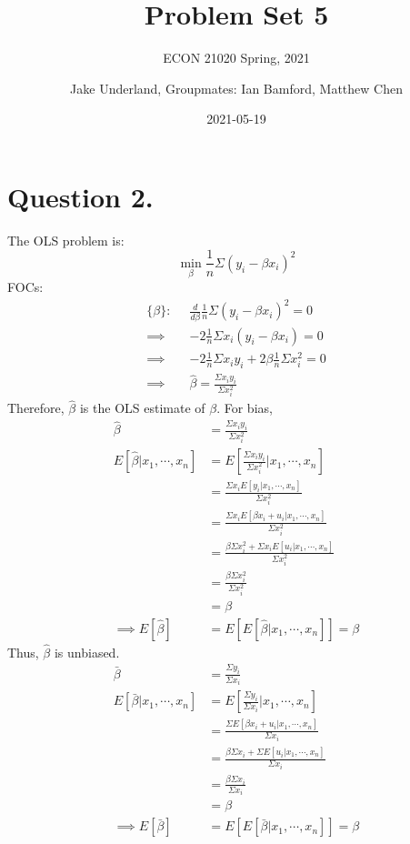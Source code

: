 \documentclass[
]{article}
\title{Problem Set 5}
\subtitle{ECON 21020 Spring, 2021}
\author{Jake Underland, Groupmates: Ian Bamford, Matthew Chen}
\date{2021-05-19}
\begin{document}
\maketitle

\hypertarget{question-2.}{%
\section{Question 2.}\label{question-2.}}

The OLS problem is: \[\min _ \beta \frac{1}{n}\Sigma(y_i-\beta x_i)^2\]
FOCs: \[\begin{aligned}
\{\beta\}: \; \; &\frac{d}{d\beta} \frac{1}{n}\Sigma(y_i-\beta x_i)^2 = 0\\
\implies& -2\frac{1}{n}\Sigma x_i(y_i-\beta x_i) = 0  \\
\implies& -2 \frac{1}{n}\Sigma x_iy_i + 2 \beta \frac{1}{n}\Sigma x_i^2 = 0 \\
\implies& \hat{\beta}= \frac{\Sigma x_iy_i}{\Sigma x_i^2}
\end{aligned}\] Therefore, \(\hat{\beta}\) is the OLS estimate of
\(\beta\). For bias, \[\begin{aligned} 
\hat{\beta} &=  \frac{\Sigma x_iy_i}{\Sigma x_i^2}\\
E[\hat{\beta}|x_1, \cdots, x_n] &= E[\frac{\Sigma x_iy_i}{\Sigma x_i^2}|x_1, \cdots, x_n]\\ 
&= \frac{\Sigma x_i E[y_i|x_1, \cdots, x_n]}{\Sigma x_i^2}\\
&= \frac{\Sigma x_i E[\beta x_i + u_i|x_1, \cdots, x_n]}{\Sigma x_i^2} \\
&= \frac{\beta \Sigma x_i ^2  + \Sigma x_iE[u_i|x_1, \cdots, x_n]}{\Sigma x_i^2} \\
&= \frac{\beta \Sigma x_i ^2}{\Sigma x_i^2}\\ 
&= \beta  \\
\implies E[\hat{\beta}] &= E[E[\hat{\beta} | x_1, \cdots, x_n]] = \beta
\end{aligned}\] Thus, \(\hat{\beta}\) is unbiased. \[\begin{aligned} 
\bar{\beta} &=  \frac{\Sigma y_i}{\Sigma x_i} \\
E[\bar{\beta}|x_1, \cdots, x_n] &= E[\frac{\Sigma y_i}{\Sigma x_i}|x_1, \cdots, x_n]\\ 
&= \frac{\Sigma E[\beta x_i + u_i|x_1, \cdots, x_n]}{\Sigma x_i}\\
&= \frac{\beta \Sigma x_i  + \Sigma E[u_i|x_1, \cdots, x_n]}{\Sigma x_i} \\
&= \frac{\beta \Sigma x_i}{\Sigma x_i}\\ 
&= \beta \\
\implies E[\bar{\beta}] &= E[E[\bar{\beta} | x_1, \cdots, x_n]] = \beta
\end{aligned}\]
\end{document}
